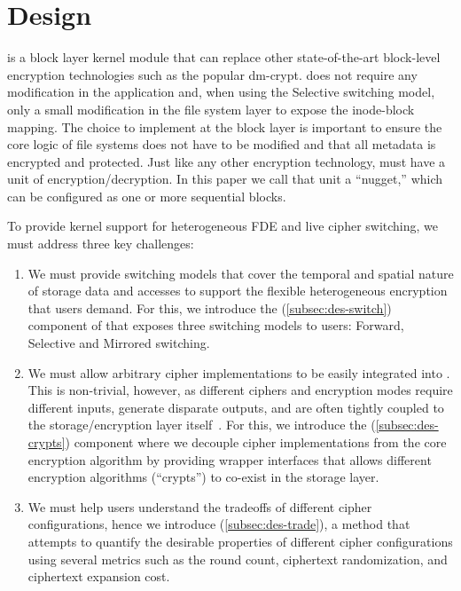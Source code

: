 \section{\sys Design}\label{sec:des}

\sys is a block layer kernel module that can replace other state-of-the-art
block-level encryption technologies such as the popular dm-crypt. \sys does not
require any modification in the application and, when using the Selective
switching model, only a small modification in the file system layer to expose
the inode-block mapping. The choice to implement \sys at the block layer is
important to ensure the core logic of file systems does not have to be modified
and that all metadata is encrypted and protected. Just like any other encryption
technology, \sys must have a unit of encryption/decryption. In this paper we
call that unit a ``nugget,'' which can be configured as one or more sequential
blocks.

To provide kernel support for heterogeneous FDE and live cipher switching, we
must address three key challenges:

\begin{enumerate}

\item We must provide switching models that cover the temporal and spatial
  nature of storage data and accesses to support the flexible heterogeneous
  encryption that users demand. For this, we introduce the \sysA
  (\cref{subsec:des-switch}) component of \sys that exposes three switching
  models to users: Forward, Selective and Mirrored switching.

\item We must allow arbitrary cipher implementations to be easily integrated
  into \sys. This is non-trivial, however, as different ciphers and encryption
  modes require different inputs, generate disparate outputs, and are often
  tightly coupled to the storage/encryption layer
  itself~\cite{dmcrypt,DmC-Android}. For this, we introduce the \sysB
  (\cref{subsec:des-crypts}) component where we decouple cipher implementations
  from the core encryption algorithm by providing wrapper interfaces that allows
  different encryption algorithms (``crypts'') to co-exist in the storage layer.

\item We must help users understand the tradeoffs of different cipher
  configurations, hence we introduce \sysC (\cref{subsec:des-trade}), a method
  that attempts to quantify the desirable properties of different cipher
  configurations using several metrics such as the round count, ciphertext
  randomization, and ciphertext expansion cost.

\end{enumerate}

